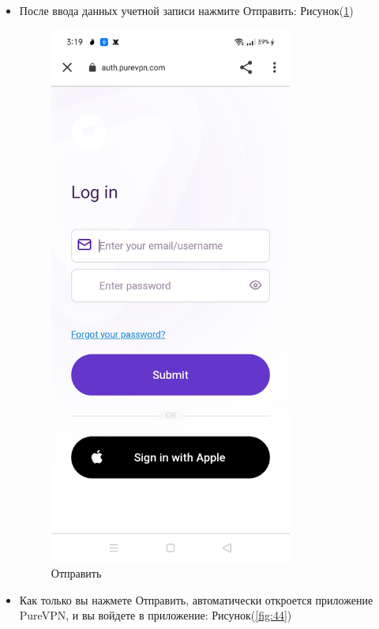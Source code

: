 \begin{itemize}
\item После ввода данных учетной записи нажмите Отправить:  Рисунок(\ref{fig:43})
\begin{figure}[H]
\includegraphics[width=8cm]{34.png}
\centering
\caption{Отправить}
\label{fig:43}
\end{figure}
\item Как только вы нажмете Отправить, автоматически откроется приложение PureVPN, и вы войдете в приложение:  Рисунок(\ref{fig:44})
\begin{figure}[H]

\end{figure}
\end{itemize}
